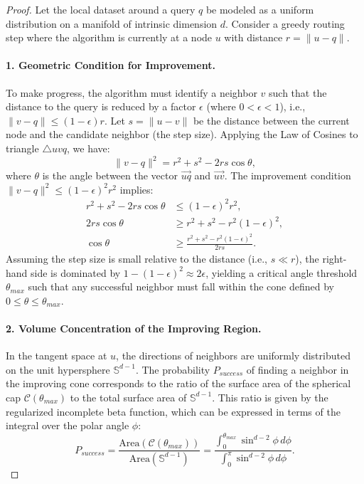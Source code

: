 \documentclass{article}
\theoremstyle{plain}
\theoremstyle{definition}
\theoremstyle{remark}
\begin{document}
\begin{proof}
Let the local dataset around a query $q$ be modeled as a uniform distribution on a manifold of intrinsic dimension $d$. Consider a greedy routing step where the algorithm is currently at a node $u$ with distance $r = \|u - q\|$.

\paragraph{1. Geometric Condition for Improvement.}
To make progress, the algorithm must identify a neighbor $v$ such that the distance to the query is reduced by a factor $\epsilon$ (where $0 < \epsilon < 1$), i.e., $\|v - q\| \le (1-\epsilon)r$.
Let $s = \|u - v\|$ be the distance between the current node and the candidate neighbor (the step size). Applying the Law of Cosines to triangle $\triangle u v q$, we have:
\begin{equation}
    \|v - q\|^2 = r^2 + s^2 - 2rs \cos \theta,
\end{equation}
where $\theta$ is the angle between the vector $\vec{u q}$ and $\vec{u v}$. The improvement condition $\|v - q\|^2 \le (1-\epsilon)^2 r^2$ implies:
\begin{align}
    r^2 + s^2 - 2rs \cos \theta &\le (1-\epsilon)^2 r^2, \nonumber \\
    2rs \cos \theta &\ge r^2 + s^2 - r^2(1-\epsilon)^2, \nonumber \\
    \cos \theta &\ge \frac{r^2 + s^2 - r^2(1-\epsilon)^2}{2rs}.
\end{align}
Assuming the step size is small relative to the distance (i.e., $s \ll r$), the right-hand side is dominated by $1 - (1-\epsilon)^2 \approx 2\epsilon$, yielding a critical angle threshold $\theta_{max}$ such that any successful neighbor must fall within the cone defined by $0 \le \theta \le \theta_{max}$.

\paragraph{2. Volume Concentration of the Improving Region.}
In the tangent space at $u$, the directions of neighbors are uniformly distributed on the unit hypersphere $\mathbb{S}^{d-1}$. The probability $P_{success}$ of finding a neighbor in the improving cone corresponds to the ratio of the surface area of the spherical cap $\mathcal{C}(\theta_{max})$ to the total surface area of $\mathbb{S}^{d-1}$.
This ratio is given by the regularized incomplete beta function, which can be expressed in terms of the integral over the polar angle $\phi$:
\begin{equation}
    P_{success} = \frac{\text{Area}(\mathcal{C}(\theta_{max}))}{\text{Area}(\mathbb{S}^{d-1})} = \frac{\int_0^{\theta_{max}} \sin^{d-2} \phi \, d\phi}{\int_0^{\pi} \sin^{d-2} \phi \, d\phi}.
\end{equation}


\end{proof}
\end{document}
